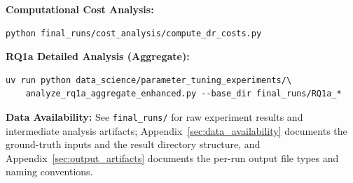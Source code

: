 \textbf{Computational Cost Analysis:}
\begin{verbatim}
python final_runs/cost_analysis/compute_dr_costs.py
\end{verbatim}

\textbf{RQ1a Detailed Analysis (Aggregate):}
\begin{verbatim}
uv run python data_science/parameter_tuning_experiments/\
    analyze_rq1a_aggregate_enhanced.py --base_dir final_runs/RQ1a_*
\end{verbatim}

\textbf{Data Availability:} See \texttt{final\_runs/} for raw experiment results and intermediate analysis artifacts; Appendix~\ref{sec:data_availability} documents the ground-truth inputs and the result directory structure, and Appendix~\ref{sec:output_artifacts} documents the per-run output file types and naming conventions.